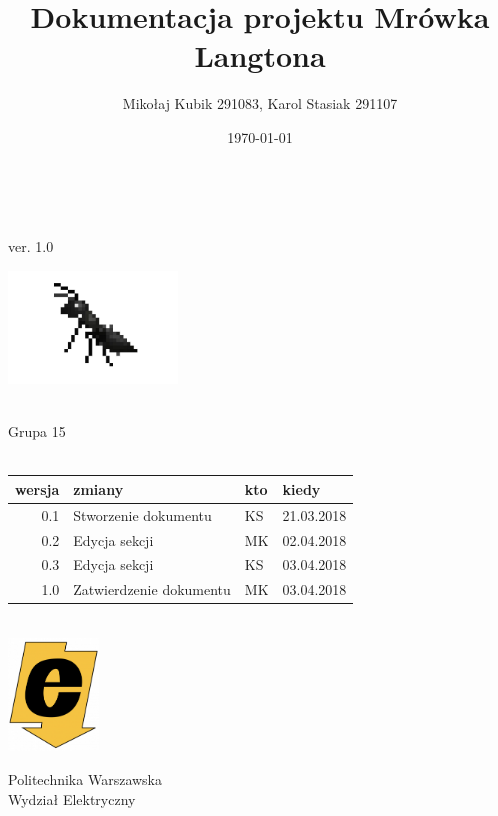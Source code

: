 \documentclass[a4paper,12pt]{article}
\title{Dokumentacja projektu Mrówka Langtona}
\author{Mikołaj Kubik 291083, Karol Stasiak 291107}
\date{\today}
\begin{document}
\begin{titlingpage}
\begin{center}
\begin{huge} 
\textbf{\thetitle}\\
\end{huge}
\vspace{0.2cm}
ver. 1.0 \\
\begin{center}
\includegraphics[height=3cm]{logo}
\end{center}
\vspace{0.2cm}
\theauthor\\
\vspace{0.2cm}
Grupa 15\\
\vspace{0.2cm}
\thedate\\
\vspace{0.5cm}
\begin{tabular}{|r|l|l|l|} \hline
wersja & zmiany & kto & kiedy \\
\hline
0.1 & Stworzenie dokumentu & KS & 21.03.2018 \\
\hline
0.2 & Edycja sekcji & MK & 02.04.2018 \\
\hline
0.3 & Edycja sekcji & KS & 03.04.2018 \\
\hline
1.0 & Zatwierdzenie dokumentu & MK & 03.04.2018 \\
\hline
\end{tabular} \\
\vspace{5,2cm}
\includegraphics[height=3cm]{ee}\\
\begin{large}
Politechnika Warszawska\\
Wydział Elektryczny\\
\end{large} 
\end{center}
\end{titlingpage}
\tableofcontents
\newpage
\end{document}
